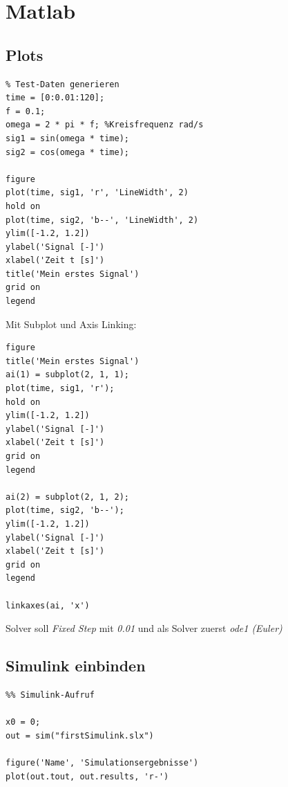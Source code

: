 \documentclass[a4paper]{article}
\title{\docTitle}
\author{Moritz}
\date{\today}
\begin{document}
\maketitle
\tableofcontents


\section{Matlab}

\subsection{Plots}

\begin{lstlisting}
% Test-Daten generieren
time = [0:0.01:120];
f = 0.1;
omega = 2 * pi * f; %Kreisfrequenz rad/s
sig1 = sin(omega * time);
sig2 = cos(omega * time);

figure
plot(time, sig1, 'r', 'LineWidth', 2)
hold on
plot(time, sig2, 'b--', 'LineWidth', 2)
ylim([-1.2, 1.2])
ylabel('Signal [-]')
xlabel('Zeit t [s]')
title('Mein erstes Signal')
grid on
legend
\end{lstlisting}

Mit Subplot und Axis Linking: 

\begin{lstlisting}
figure
title('Mein erstes Signal')
ai(1) = subplot(2, 1, 1);
plot(time, sig1, 'r');
hold on
ylim([-1.2, 1.2])
ylabel('Signal [-]')
xlabel('Zeit t [s]')
grid on
legend

ai(2) = subplot(2, 1, 2);
plot(time, sig2, 'b--');
ylim([-1.2, 1.2])
ylabel('Signal [-]')
xlabel('Zeit t [s]')
grid on
legend

linkaxes(ai, 'x')
\end{lstlisting}

Solver soll \textit{Fixed Step} mit \textit{0.01} und als Solver zuerst \textit{ode1 (Euler)}

\subsection{Simulink einbinden}

\begin{lstlisting}
%% Simulink-Aufruf

x0 = 0;
out = sim("firstSimulink.slx")

figure('Name', 'Simulationsergebnisse')
plot(out.tout, out.results, 'r-')
\end{lstlisting}
\end{document}
